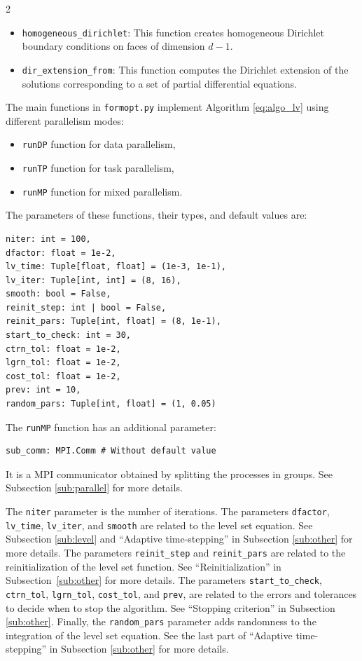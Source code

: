 \documentclass[a4paper, oneside]{article}
\newcommand{\code}[1]{\texttt{#1}}
\begin{document}
\begin{multicols}{2}
\begin{itemize}[left=0.0em]
\item \code{homogeneous\_dirichlet}:
This function creates homogeneous Dirichlet boundary conditions
on faces of dimension $d-1$.

\item \code{dir\_extension\_from}:
This function computes the Dirichlet extension of the solutions
corresponding to a set of partial differential equations.
\end{itemize}

The main functions in \code{formopt.py}
implement Algorithm \ref{eq:algo_lv} using
different parallelism modes:
\begin{itemize}[left=0.0em]
\item \code{runDP} function for data parallelism,
\item \code{runTP} function for task parallelism, 
\item \code{runMP} function for mixed parallelism.
\end{itemize}

The parameters of these functions, their types, and default values are:
\begin{lstlisting}
niter: int = 100,
dfactor: float = 1e-2,
lv_time: Tuple[float, float] = (1e-3, 1e-1),
lv_iter: Tuple[int, int] = (8, 16),
smooth: bool = False,
reinit_step: int | bool = False,
reinit_pars: Tuple[int, float] = (8, 1e-1),
start_to_check: int = 30,
ctrn_tol: float = 1e-2,
lgrn_tol: float = 1e-2,
cost_tol: float = 1e-2,
prev: int = 10,
random_pars: Tuple[int, float] = (1, 0.05)
\end{lstlisting}
The \code{runMP} function has an additional parameter:
\begin{lstlisting}
sub_comm: MPI.Comm # Without default value
\end{lstlisting}
It is a MPI communicator obtained by splitting the processes in groups.
See Subsection \ref{sub:parallel} for more details.

The \code{niter} parameter is the number of iterations.
The parameters \code{dfactor}, \code{lv\_time}, \code{lv\_iter}, and \code{smooth}
are related to the level set equation.
See Subsection \ref{sub:level} and ``Adaptive time-stepping'' in Subsection \ref{sub:other} for more details.
The parameters \code{reinit\_step} and \code{reinit\_pars}
are related to the reinitialization of the level set function.
See ``Reinitialization'' in Subsection~\ref{sub:other} for more details.
The parameters \code{start\_to\_check}, \code{ctrn\_tol}, \code{lgrn\_tol}, \code{cost\_tol}, and \code{prev}, are related
to the errors and tolerances to decide when to stop the algorithm. See ``Stopping criterion'' in Subsection \ref{sub:other}.
Finally, the \code{random\_pars} parameter adds randomness to the integration of the level set equation.
See the last part of ``Adaptive time-stepping'' in Subsection \ref{sub:other} for more details.


\end{multicols}
\end{document}
